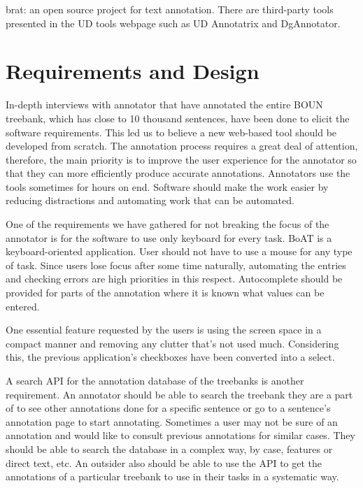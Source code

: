 \documentclass[
]{ceurart}
\begin{document}
brat: an open source project for text annotation.\cite{brat}
There are third-party tools presented in the UD tools webpage such as UD Annotatrix\cite{tyers-etal:2018} and DgAnnotator\cite{dgannotator}.

\section{Requirements and Design}
\label{sec:requirements}

In-depth interviews with annotator that have annotated the entire BOUN treebank, which has close to 10 thousand sentences, have been done to elicit the software requirements.
This led us to believe a new web-based tool should be developed from scratch.
The annotation process requires a great deal of attention, therefore, the main priority is to improve the user experience for the annotator so that they can more efficiently produce accurate annotations.
Annotators use the tools sometimes for hours on end.
Software should make the work easier by reducing distractions and automating work that can be automated.

One of the requirements we have gathered for not breaking the focus of the annotator is for the software to use only keyboard for every task.
BoAT is a keyboard-oriented application.
User should not have to use a mouse for any type of task.
Since users lose focus after some time naturally, automating the entries and checking errors are high priorities in this respect.
Autocomplete should be provided for parts of the annotation where it is known what values can be entered.

One essential feature requested by the users is using the screen space in a compact manner and removing any clutter that's not used much.
Considering this, the previous application's checkboxes have been converted into a select.

A search API for the annotation database of the treebanks is another requirement.
An annotator should be able to search the treebank they are a part of to see other annotations done for a specific sentence or go to a sentence's annotation page to start annotating.
Sometimes a user may not be sure of an annotation and would like to consult previous annotations for similar cases.
They should be able to search the database in a complex way, by case, features or direct text, etc.
An outsider also should be able to use the API to get the annotations of a particular treebank to use in their tasks in a systematic way.
\end{document}
